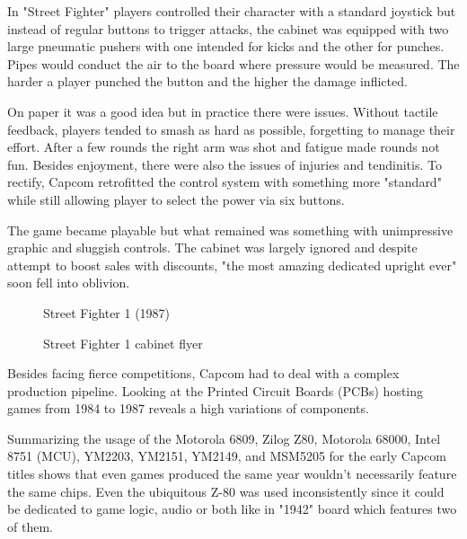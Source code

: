 In "Street Fighter" players controlled their character with a standard joystick but instead of regular buttons to trigger attacks, the cabinet was equipped with two large pneumatic pushers with one intended for kicks and the other for punches. Pipes would conduct the air to the board where pressure would be measured. The harder a player punched the button and the higher the damage inflicted.

On paper it was a good idea but in practice there were issues. Without tactile feedback, players tended to smash as hard as possible, forgetting to manage their effort. After a few rounds the right arm was shot and fatigue made rounds not fun. Besides enjoyment, there were also the issues of injuries and tendinitis. To rectify, Capcom retrofitted the control system with something more "standard" while still allowing player to select the power via six buttons. 

The game became playable but what remained was something with unimpressive graphic and sluggish controls. The cabinet was largely ignored and despite attempt to boost sales with discounts, "the most amazing dedicated upright ever" soon fell into oblivion.


\begin{figure}[H]
\caption*{Street Fighter 1 (1987)}
\end{figure}



\begin{figure}[H]
\caption*{Street Fighter 1 cabinet flyer}
\end{figure}


Besides facing fierce competitions, Capcom had to deal with a complex production pipeline. Looking at the Printed Circuit Boards (PCBs) hosting games from 1984 to 1987 reveals a high variations of components.

Summarizing the usage of the Motorola 6809, Zilog Z80, Motorola 68000, Intel 8751 (MCU), YM2203, YM2151, YM2149, and MSM5205 for the early Capcom titles shows that even games produced the same year wouldn't necessarily feature the same chips. Even the ubiquitous Z-80 was used inconsistently since it could be dedicated to game logic, audio or both like in "1942" board which features two of them.



